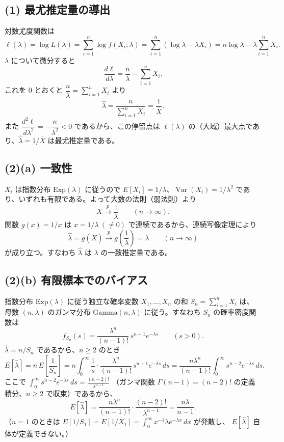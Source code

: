 \subsection*{(1) 最尤推定量の導出}

対数尤度関数は
\[
\ell(\lambda) = \log L(\lambda) = \sum_{i=1}^{n} \log f(X_i; \lambda)
= \sum_{i=1}^{n} \left(\log \lambda - \lambda X_i\right)
= n \log \lambda - \lambda \sum_{i=1}^{n} X_i .
\]
$\lambda$ について微分すると
\[
\frac{d\ell}{d\lambda} = \frac{n}{\lambda} - \sum_{i=1}^{n} X_i .
\]
これを $0$ とおくと $\dfrac{n}{\lambda} = \displaystyle\sum_{i=1}^{n} X_i$ より
\[
\hat{\lambda} = \frac{n}{\displaystyle\sum_{i=1}^{n} X_i} = \frac{1}{\overline{X}} .
\]
また $\dfrac{d^{2}\ell}{d\lambda^{2}} = -\dfrac{n}{\lambda^{2}} < 0$ であるから、この停留点は
$\ell(\lambda)$ の（大域）最大点であり、$\hat{\lambda} = 1/\overline{X}$ は最尤推定量である。

\subsection*{(2)(a) 一致性}

$X_i$ は指数分布 $\mathrm{Exp}(\lambda)$ に従うので $E[X_i] = 1/\lambda$、$\operatorname{Var}(X_i) = 1/\lambda^{2}$
であり、いずれも有限である。よって大数の法則（弱法則）より
\[
\overline{X} \xrightarrow{p} \frac{1}{\lambda} \qquad (n \to \infty).
\]
関数 $g(x) = 1/x$ は $x = 1/\lambda \ (\ne 0)$ で連続であるから、連続写像定理により
\[
\hat{\lambda} = g(\overline{X}) \xrightarrow{p} g\!\left(\frac{1}{\lambda}\right) = \lambda \qquad (n \to \infty)
\]
が成り立つ。すなわち $\hat{\lambda}$ は $\lambda$ の一致推定量である。

\subsection*{(2)(b) 有限標本でのバイアス}

指数分布 $\mathrm{Exp}(\lambda)$ に従う独立な確率変数 $X_1, \dots, X_n$ の和 $S_n = \sum_{i=1}^{n} X_i$ は、
母数 $(n, \lambda)$ のガンマ分布 $\mathrm{Gamma}(n, \lambda)$ に従う。すなわち $S_n$ の確率密度関数は
\[
f_{S_n}(s) = \frac{\lambda^{n}}{(n-1)!}\, s^{n-1} e^{-\lambda s} \qquad (s > 0).
\]
$\hat{\lambda} = n/S_n$ であるから、$n \ge 2$ のとき
\[
E[\hat{\lambda}] = n\, E\!\left[\frac{1}{S_n}\right]
= n \int_{0}^{\infty} \frac{1}{s} \cdot \frac{\lambda^{n}}{(n-1)!}\, s^{n-1} e^{-\lambda s} \, ds
= \frac{n\lambda^{n}}{(n-1)!} \int_{0}^{\infty} s^{n-2} e^{-\lambda s} \, ds .
\]
ここで $\displaystyle\int_{0}^{\infty} s^{n-2} e^{-\lambda s}\, ds = \frac{(n-2)!}{\lambda^{n-1}}$
（ガンマ関数 $\Gamma(n-1) = (n-2)!$ の定義積分、$n \ge 2$ で収束）であるから、
\[
E[\hat{\lambda}] = \frac{n\lambda^{n}}{(n-1)!} \cdot \frac{(n-2)!}{\lambda^{n-1}}
= \frac{n\lambda}{n-1} .
\]
（$n = 1$ のときは $E[1/S_1] = E[1/X_1] = \int_0^\infty x^{-1}\lambda e^{-\lambda x}\,dx$ が発散し、
$E[\hat{\lambda}]$ 自体が定義できない。）

